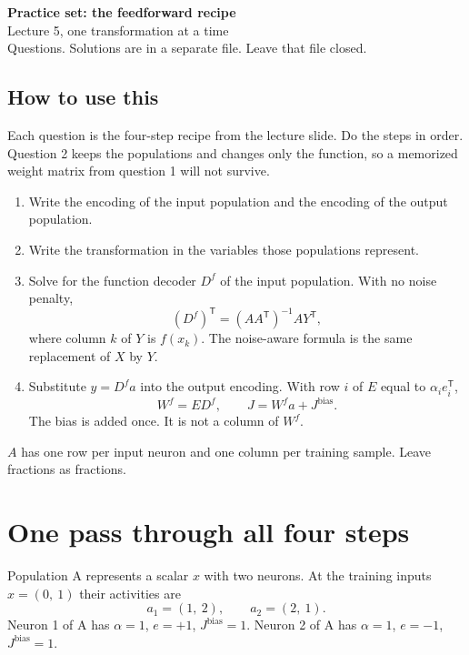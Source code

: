 \documentclass[11pt,letterpaper]{article}
\newcommand{\Jb}{J^{\mathrm{bias}}}
\begin{document}
\begin{center}
{\Large\bfseries Practice set: the feedforward recipe}\\[2pt]
{\large Lecture 5, one transformation at a time}\\[4pt]
{\normalsize Questions. Solutions are in a separate file. Leave that file closed.}
\end{center}

\subsection*{How to use this}

Each question is the four-step recipe from the lecture slide. Do the steps in order. Question 2 keeps the populations and changes only the function, so a memorized weight matrix from question 1 will not survive.

\begin{idea}
\begin{enumerate}[leftmargin=1.4em,itemsep=3pt]
\item Write the encoding of the input population and the encoding of the output population.
\item Write the transformation in the variables those populations represent.
\item Solve for the function decoder $D^f$ of the input population. With no noise penalty,
\[
(D^f)^{\mathsf T} = (AA^{\mathsf T})^{-1} A Y^{\mathsf T},
\]
where column $k$ of $Y$ is $f(x_k)$. The noise-aware formula is the same replacement of $X$ by $Y$.
\item Substitute $\hat y = D^f a$ into the output encoding. With row $i$ of $E$ equal to $\alpha_i e_i^{\mathsf T}$,
\[
W^f = E D^f, \qquad J = W^f a + \Jb.
\]
The bias is added once. It is not a column of $W^f$.
\end{enumerate}
\end{idea}

$A$ has one row per input neuron and one column per training sample. Leave fractions as fractions.

\section{One pass through all four steps}

Population A represents a scalar $x$ with two neurons. At the training inputs $x = (0,\ 1)$ their activities are
\[
a_1 = (1,\ 2), \qquad a_2 = (2,\ 1).
\]
Neuron 1 of A has $\alpha = 1$, $e = +1$, $\Jb = 1$. Neuron 2 of A has $\alpha = 1$, $e = -1$, $\Jb = 1$.
\end{document}
